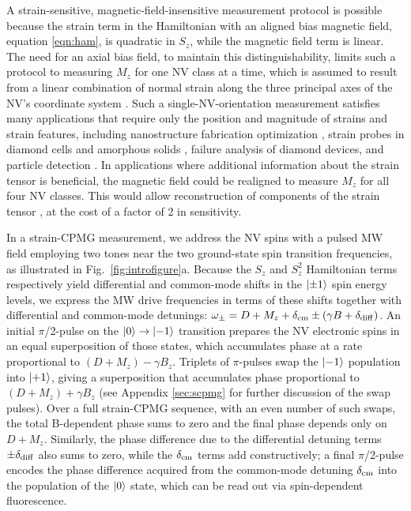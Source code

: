 \documentclass[reprint,superscriptaddress,hyphens,amsmath,amssymb,aps,prx,float]{revtex4-2}
\begin{document}
A strain-sensitive, magnetic-field-insensitive measurement protocol is possible because the strain term in the Hamiltonian with an aligned bias magnetic field, equation \eqref{eqn:ham}, is quadratic in $S_z$, while the magnetic field term is linear.  The need for an axial bias field, to maintain this distinguishability, limits such a protocol to measuring $M_z$ for one NV class at a time, which is assumed to result from a linear combination of normal strain along the three principal axes of the NV's coordinate system \cite{BarfussHybridSystems2019}.  Such a single-NV-orientation measurement satisfies many applications that require only the position and magnitude of strains and strain features, including nanostructure fabrication optimization \cite{KnauerFabStrain2020}, strain probes in diamond cells and amorphous solids \cite{HoAnvilCells2020,HoAmorphousSolids2021}, failure analysis of diamond devices, and particle detection \cite{MarshallQST2021}.  In applications where additional information about the strain tensor is beneficial, the magnetic field could be realigned to measure $M_z$ for all four NV classes.  This would allow reconstruction of components of the strain tensor \cite{StrainPaper}, at the cost of a factor of 2 in sensitivity.

\sequencefig

In a strain-CPMG measurement, we address the NV spins with a pulsed MW field employing two tones near the two ground-state spin transition frequencies, as illustrated in Fig.~\ref{fig:introfigure}a.  Because the $S_z$ and $S_z^2$ Hamiltonian terms respectively yield differential and common-mode shifts in the $\ket{\pm1}$ spin energy levels, we express the MW drive frequencies in terms of these shifts together with differential and common-mode detunings: $\omega_\pm=D+M_z+\delta_{\rm cm}\pm(\gamma B+\delta_{\rm diff})$.  An initial $\pi$/2-pulse on the $\ket{0}\rightarrow\ket{-1}$ transition prepares the NV electronic spins in an equal superposition of those states, which accumulates phase at a rate proportional to $(D+M_z)-\gamma B_z$. Triplets of $\pi$-pulses swap the $\ket{-1}$ population into $\ket{+1}$, giving a superposition that accumulates phase proportional to $(D+M_z)+\gamma B_z$ (see Appendix \ref{sec:scpmg} for further discussion of the swap pulses). Over a full strain-CPMG sequence, with an even number of such swaps, the total B-dependent phase sums to zero and the final phase depends only on $D+M_z$. Similarly, the phase difference due to the differential detuning terms $\pm \delta_{\rm diff}$ also sums to zero, while the $\delta_{\rm cm}$ terms add constructively; a final $\pi$/2-pulse encodes the phase difference acquired from the common-mode detuning $\delta_{\rm cm}$ into the population of the $\ket{0}$ state, which can be read out via spin-dependent fluorescence.
\end{document}
